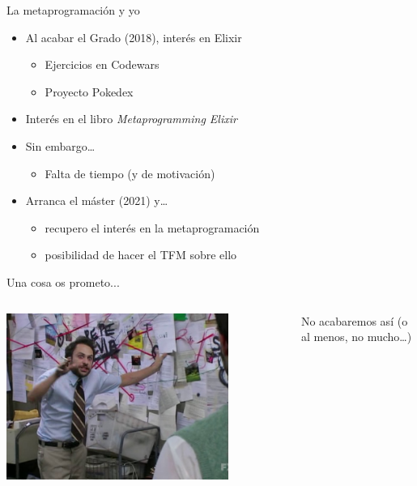 \documentclass[14pt,aspectratio=169]{beamer}
\begin{document}
\begin{frame}{La metaprogramación y yo}
  \begin{itemize}
    \item Al acabar el Grado (2018), interés en Elixir
    \begin{itemize}
      \item Ejercicios en Codewars
      \item Proyecto Pokedex
    \end{itemize}
    \item Interés en el libro \textit{Metaprogramming Elixir}
    \item Sin embargo\dots
    \begin{itemize}
      \item Falta de tiempo (y de motivación)
    \end{itemize}
    \item Arranca el máster (2021) y\dots
    \begin{itemize}
      \item recupero el interés en la metaprogramación
      \item posibilidad de hacer el TFM sobre ello
    \end{itemize}
  \end{itemize}
\end{frame}

\begin{frame}{Una cosa os prometo...}
  \begin{columns}
    \begin{column}{0.5\textwidth}
      \centering
      \includegraphics[width=0.8\textwidth]{charlie_day.png}
    \end{column}

    \begin{column}{0.5\textwidth}
      No acabaremos así (o al menos, no mucho\dots)
    \end{column}
  \end{columns}
\end{frame}
\end{document}
